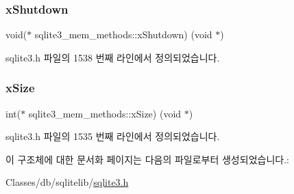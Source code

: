 \subsubsection{\texorpdfstring{x\+Shutdown}{xShutdown}}
{\footnotesize\ttfamily void($\ast$ sqlite3\+\_\+mem\+\_\+methods\+::x\+Shutdown) (void $\ast$)}



sqlite3.\+h 파일의 1538 번째 라인에서 정의되었습니다.

\mbox{\label{structsqlite3__mem__methods_a703ec736e9ce21fd43b9602bcd07fa8e}} 
\subsubsection{\texorpdfstring{x\+Size}{xSize}}
{\footnotesize\ttfamily int($\ast$ sqlite3\+\_\+mem\+\_\+methods\+::x\+Size) (void $\ast$)}



sqlite3.\+h 파일의 1535 번째 라인에서 정의되었습니다.



이 구조체에 대한 문서화 페이지는 다음의 파일로부터 생성되었습니다.\+:\begin{DoxyCompactItemize}
\item 
Classes/db/sqlitelib/\hyperlink{sqlite3_8h}{sqlite3.\+h}\end{DoxyCompactItemize}
